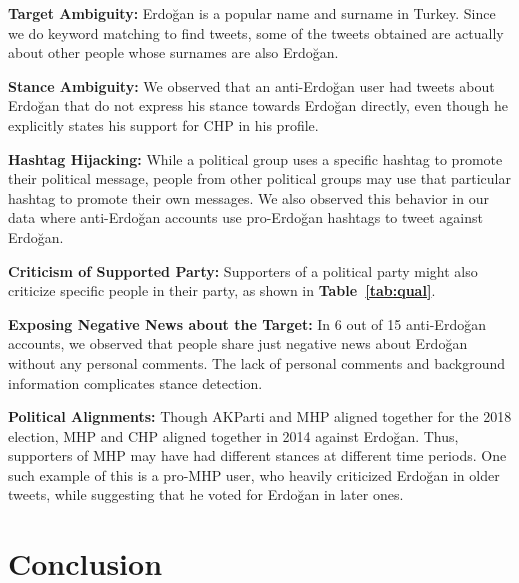\documentclass[letterpaper]{article} \usepackage{aaai20}  \usepackage{times}  \usepackage{stackengine}
\begin{document}
       \noindent
       \textbf{Target Ambiguity:} Erdo\u{g}an is a popular name and surname in Turkey. Since we do keyword matching to find tweets, some of the tweets obtained are actually about other people whose surnames are also Erdo\u{g}an.
       
       \noindent
        \textbf{Stance Ambiguity:} We observed that an anti-Erdo\u{g}an user had tweets about Erdo\u{g}an that do not express his stance towards Erdo\u{g}an directly, even though he explicitly states his support for CHP in his profile.
        
        \noindent
        \textbf{Hashtag Hijacking:} While a political group uses a specific hashtag to promote their political message, people from other political groups may use that particular hashtag to promote their own messages.  We also observed this behavior in our data where anti-Erdo\u{g}an accounts use pro-Erdo\u{g}an hashtags to tweet against Erdo\u{g}an.
        
        \noindent
        \textbf{Criticism of Supported Party:} Supporters of a political party might also criticize specific people in their party, as shown in \textbf{Table~\ref{tab:qual}}.
       
       \noindent
       \textbf{Exposing Negative News about the Target:} In 6 out of 15 anti-Erdo\u{g}an accounts, we observed that people share just negative news about Erdo\u{g}an without any personal comments. The lack of personal comments and background information complicates stance detection.
       
       \noindent
       \textbf{Political Alignments:} Though AKParti and MHP aligned together for the 2018 election, MHP and CHP aligned together in 2014 against Erdo\u{g}an. Thus, supporters of MHP may have had different stances at different time periods.
       One such example of this is a pro-MHP user, who heavily criticized Erdo\u{g}an in older tweets, while suggesting that he voted for Erdo\u{g}an in later ones.
       





\section{Conclusion}
\end{document}
